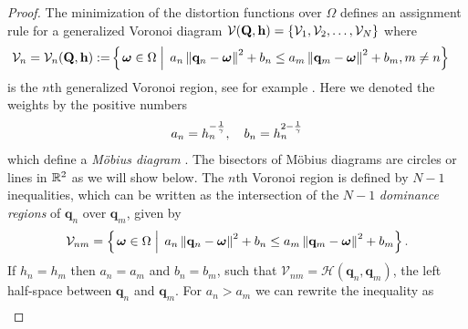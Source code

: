 \documentclass[12pt,onecolumn,final,letterpaper]{IEEEtran}
\newif\ifarxiv\arxivfalse
\newenvironment{remark}{\par\vspace{1.5ex}\noindent{\em Remark\/}.}{\par\vspace{1.5ex}}
\newcounter{example}[section]
\renewcommand{\vp}{\mathbf q}
\renewcommand{\vP}{\mathbf Q}
\newcommand{\HS}{\ensuremath{\mathcal{H}}}          %
\newcommand{\gP}{\ensuremath{\vP}}          %
\newcommand{\gp}{\ensuremath{\vp}}          %
\newcommand{\bH}{\ensuremath{\vh}}          %
\newcommand{\Vor}{\ensuremath{\mathcal{V}}}         %
\begin{document}
\ifarxiv
\begin{remark}
  It is also possible that two quantization points are equal, but have different parameters. If the parameter
  ratio is very small or very large, one quantization point can become redundant, i.e., if its optimal quantization set is empty.
  In fact, if we optimize over all quantizer points, such a case will be excluded, which we will show for one-dimension
  in \lemref{lemma:allActive}.
\end{remark}
\fi
%
\ifarxiv
\begin{proof}
  The minimization of the distortion functions over $\Omega$ defines an assignment rule for a
  generalized Voronoi diagram $\Vor(\gP,\bH)=\{\Vor_1,\Vor_2,\dots,\Vor_N\}$ where 
  \begin{align}
    \Vor_{n} =\Vor_n(\gP,\bH):=
      &\set{\vome\in\Ome}{ a_n\Norm{\vp_n-\vome}^2 +b_n \leq  a_m\Norm{\vp_m-\vome}^2 +b_m, m\not=n}
  \end{align}
  is the $n$th generalized Voronoi region, see for example \cite[Cha.3]{OBSC00}. Here we denoted the weights by the positive numbers
  \begin{align}
    a_n = h_n^{-\frac{1}{\gamma}}, \quad b_n=h_n^{2-\frac{1}{\gamma}}
  \end{align}
  which define a \emph{M{\"o}bius diagram} \cite{BK06b,BWY07}. The bisectors of M{\"o}bius diagrams are circles or lines
  in ${\mathbb R}^2$ as we will show below.
  The $n$th Voronoi region is defined by $N-1$ inequalities, which  can be written as the intersection of the $N-1$
  \emph{dominance regions} of $\vp_n$ over $\vp_m$, given by 
  \begin{align}
    \Vor_{nm}=\set{\vome\in\Ome}{ a_n\Norm{\vp_n-\vome}^2 +b_n \leq  a_m\Norm{\vp_m-\vome}^2 +b_m}.
  \end{align}
  If $h_n=h_m$ then $a_n=a_m$ and $b_n=b_m$, such that $\Vor_{nm}=\HS(\vp_n,\vp_m)$, the left half-space between $\vp_n$
  and $\vp_m$. For $a_n>a_m$ we can rewrite the inequality as 
  \begin{align*}

\end{align*}
\end{proof}
\end{document}
